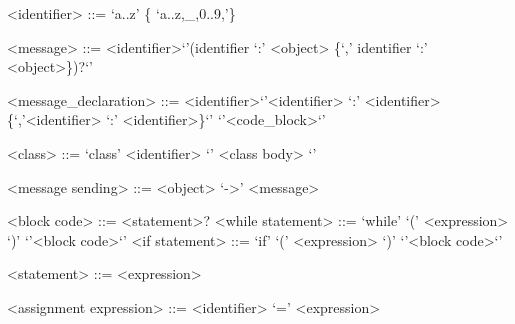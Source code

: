 \documentclass{eplDoc}
\begin{document}
\maketitle
\newpage

\begin{grammar}
<identifier> ::= `a..z' \{ `a..z,\_,0..9,'\} 

<message> ::= <identifier>`{'(identifier `:' <object> \{`,' identifier `:' <object>\})?`}'

<message\_declaration> ::= <identifier>`{'<identifier> `:' <identifier> \{`,'<identifier> `:' <identifier>\}`}' `{'<code\_block>`}'

<class> ::= `class' <identifier> `{' <class body> `}'

<message sending> ::= <object> `->' <message>

<block code> ::= { <statement>? }
<while statement> ::= `while' `(' <expression> `)'  `{'<block code>`}'
<if statement> ::= `if' `(' <expression> `)'  `{'<block code>`}'

<statement> ::= <expression>

<assignment expression> ::= <identifier> `=' <expression>
\end{grammar}
\end{document}
